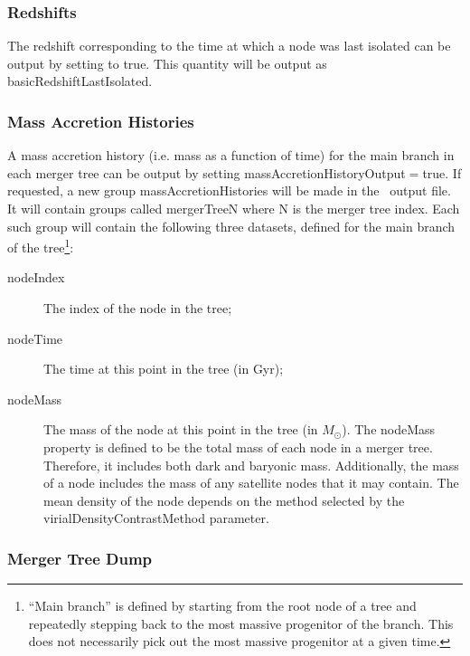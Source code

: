 \subsubsection{Redshifts}

The redshift corresponding to the time at which a node was last isolated can be output by setting {\normalfont \ttfamily [outputNodeRedshifts]} to {\normalfont \ttfamily true}. This quantity will be output as {\normalfont \ttfamily basicRedshiftLastIsolated}.

\subsubsection{Mass Accretion Histories}

A mass accretion history (i.e. mass as a function of time) for the main branch in each merger tree can be output by setting {\normalfont \ttfamily massAccretionHistoryOutput}$=${\normalfont \ttfamily true}. If requested, a new group {\normalfont \ttfamily massAccretionHistories} will be made in the \glc\ output file. It will contain groups called {\normalfont \ttfamily mergerTreeN} where {\normalfont \ttfamily N} is the merger tree index. Each such group will contain the following three datasets, defined for the main branch of the tree\footnote{``Main branch'' is defined by starting from the root node of a tree and repeatedly stepping back to the most massive progenitor of the branch. This does not necessarily pick out the most massive progenitor at a given time.}:
\begin{description}
 \item [{\normalfont \ttfamily nodeIndex}] The index of the node in the tree;
 \item [{\normalfont \ttfamily nodeTime}] The time at this point in the tree (in Gyr);
 \item [{\normalfont \ttfamily nodeMass}] The mass of the node at this point in the tree (in $M_\odot$). The {\normalfont \ttfamily nodeMass} property is defined to be the total mass of each node in a merger tree. Therefore, it includes both dark and baryonic mass. Additionally, the mass of a node includes the mass of any satellite nodes that it may contain. The mean density of the node depends on the method selected by the {\normalfont \ttfamily virialDensityContrastMethod} parameter.
\end{description}

\subsubsection{Merger Tree Dump}

